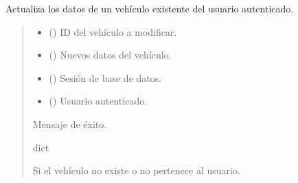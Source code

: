 \documentclass[letterpaper,10pt,spanish]{sphinxmanual}
\begin{document}
\begin{fulllineitems}
\label{\detokenize{endpoints:main.editar_vehiculo}}
\pysigstartsignatures
\pysiglinewithargsret
{}
{\sphinxparamcomma {}\sphinxparamcomma {}\sphinxparamcomma {}}
{}
\pysigstopsignatures
\sphinxAtStartPar
Actualiza los datos de un vehículo existente del usuario autenticado.
\begin{quote}\begin{description}
\begin{itemize}
\item {} 
\sphinxAtStartPar
{} () \textendash{} ID del vehículo a modificar.

\item {} 
\sphinxAtStartPar
{} () \textendash{} Nuevos datos del vehículo.

\item {} 
\sphinxAtStartPar
{} () \textendash{} Sesión de base de datos.

\item {} 
\sphinxAtStartPar
{} ({\hyperref[\detokenize{modelos:main.Usuario}]{}}) \textendash{} Usuario autenticado.

\end{itemize}

\sphinxAtStartPar
Mensaje de éxito.

\sphinxAtStartPar
dict

\sphinxAtStartPar
{} \textendash{} Si el vehículo no existe o no pertenece al usuario.

\end{description}\end{quote}

\end{fulllineitems}
\end{document}

